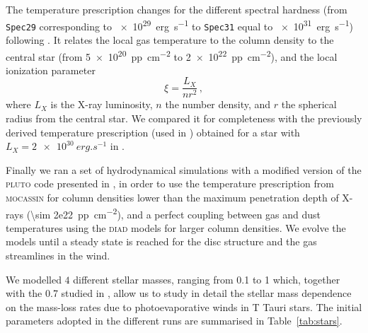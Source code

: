 \documentclass[usenatbib,useAMS,usedcolumn]{mnras}
\begin{document}
The temperature prescription changes for the different spectral hardness (from \texttt{Spec29} corresponding to \SI{e29}{erg.s^{-1}} to \texttt{Spec31} equal to \SI{e31}{erg.s^{-1}}) following .
It relates the local gas temperature to the column density to the central star (from \SI{5e20}{pp.cm^{-2}} to \SI{2e22}{pp.cm^{-2}}), and the local ionization parameter 
\begin{equation}
    \xi = \frac{L_X}{n r^2}\,,
\end{equation}
where $L_X$ is the X-ray luminosity, $n$ the number density, and $r$ the spherical radius from the central star. We compared it for completeness with the previously derived temperature prescription (used in ) obtained for a star with $L_X=\SI{2e30}{erg.s^{-1}}$ in .

Finally we ran a set of hydrodynamical simulations with a modified version of the \textsc{pluto} code  presented in , in order to use the temperature prescription from \textsc{mocassin} for column densities lower than the maximum penetration depth of X-rays (\SI{\sim 2e22}{pp.cm^{-2}}), and a perfect coupling between gas and dust temperatures using the \textsc{diad} models for larger column densities.
We evolve the models until a steady state is reached for the disc structure and the gas streamlines in the wind.

We modelled $4$ different stellar masses, ranging from \SI{0.1}{\solarmass} to \SI{1}{\solarmass} which, together with the \SI{0.7}{\solarmass} studied in , allow us to study in detail the stellar mass dependence on the mass-loss rates due to photoevaporative winds in T Tauri stars. The initial parameters adopted in the different runs are summarised in Table~\ref{tab:stars}.
\end{document}
